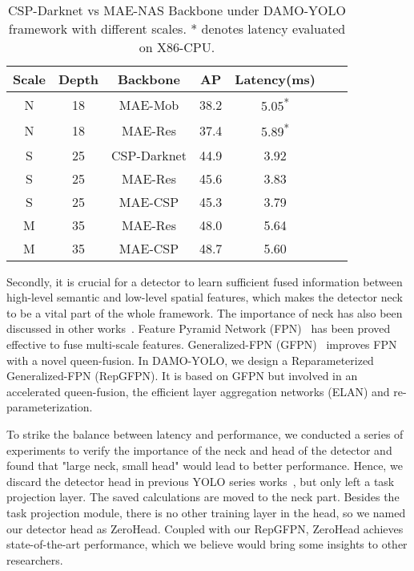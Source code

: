 \documentclass[10pt,twocolumn,letterpaper]{article}
\begin{document}
\begin{table}
    \begin{center}
    \caption{CSP-Darknet vs MAE-NAS Backbone under DAMO-YOLO framework with different scales. * denotes latency evaluated on X86-CPU.}
    \label{tab:backbone_ab}
    \setlength{\tabcolsep}{3pt}
    \begin{tabular}{ccccccc}
    \toprule
     Scale & Depth&Backbone & AP & Latency(ms)    \\
    \midrule 
     N  & 18 & MAE-Mob & 38.2 & 5.05\textsuperscript{*}\\
     N& 18 & MAE-Res & 37.4 & 5.89\textsuperscript{*} \\
     S & 25 & CSP-Darknet & 44.9 & 3.92 \\
    S & 25&MAE-Res & 45.6 & 3.83 \\
    S & 25&MAE-CSP & 45.3 & 3.79  \\
    M & 35&MAE-Res & 48.0  & 5.64   \\
    M & 35&MAE-CSP  & 48.7 & 5.60     \\
    \bottomrule
    \end{tabular}
    \end{center}
\end{table}


Secondly, it is crucial for a detector to learn sufficient fused information between high-level semantic and low-level spatial features, which makes the detector neck to be a vital part of the whole framework. The importance of neck has also been discussed in other works~\cite{jiang2022giraffedet,ghiasi2019fpn, wang2019panet, tan2020efficientdet}. Feature Pyramid Network (FPN)~\cite{ghiasi2019fpn} has been proved effective to fuse multi-scale features. Generalized-FPN (GFPN)~\cite{jiang2022giraffedet} improves FPN with a novel queen-fusion. In DAMO-YOLO, we design a Reparameterized Generalized-FPN (RepGFPN). It is based on GFPN but involved in an accelerated queen-fusion, the efficient layer aggregation networks (ELAN) and re-parameterization.

To strike the balance between latency and performance, we conducted a series of experiments to verify the importance of the neck and head of the detector and found that "large neck, small head" would lead to better performance.
Hence, we discard the detector head in previous YOLO series works~\cite{redmon2016yolo,yolov2,yolov3,yolov4,yolov5,yolox,yoloe}, but only left a task projection layer. The saved calculations are moved to the neck part.  
Besides the task projection module, there is no other training layer in the head, so we named our detector head as ZeroHead. Coupled with our RepGFPN, ZeroHead achieves state-of-the-art performance, which we believe would bring some insights to other researchers.
\end{document}
